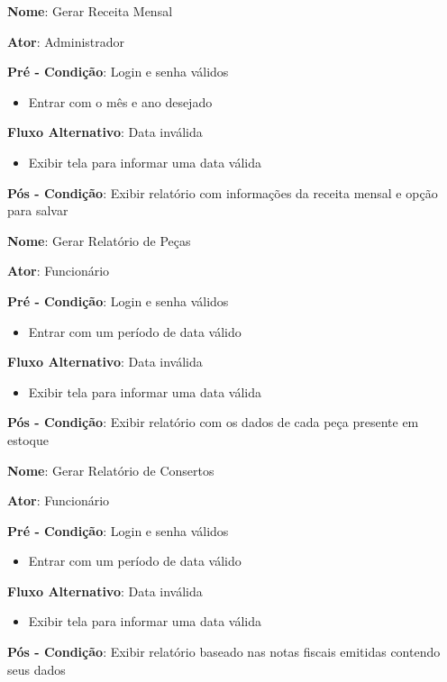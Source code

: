 \documentclass[a4paper,10pt]{article}
\begin{document}
\begin{framed}
\textbf{Nome}: Gerar Receita Mensal

\textbf{Ator}: Administrador

\textbf{Pré - Condição}: Login e senha válidos
\begin{itemize}
\item Entrar com o mês e ano desejado
\end{itemize}
\textbf{Fluxo Alternativo}: Data inválida
\begin{itemize}
\item Exibir tela para informar uma data válida
\end{itemize}
\textbf{Pós - Condição}: Exibir relatório com informações da receita mensal e opção para salvar
\end{framed}

\begin{framed}
\textbf{Nome}: Gerar Relatório de Peças

\textbf{Ator}: Funcionário

\textbf{Pré - Condição}: Login e senha válidos
\begin{itemize}
\item Entrar com um período de data válido
\end{itemize}
\textbf{Fluxo Alternativo}: Data inválida
\begin{itemize}
\item Exibir tela para informar uma data válida
\end{itemize}
\textbf{Pós - Condição}: Exibir relatório com os dados de cada peça presente em estoque
\end{framed}

\begin{framed}
\textbf{Nome}: Gerar Relatório de Consertos

\textbf{Ator}: Funcionário

\textbf{Pré - Condição}: Login e senha válidos
\begin{itemize}
\item Entrar com um período de data válido
\end{itemize}
\textbf{Fluxo Alternativo}: Data inválida
\begin{itemize}
\item Exibir tela para informar uma data válida
\end{itemize}
\textbf{Pós - Condição}: Exibir relatório baseado nas notas fiscais emitidas contendo seus dados
\end{framed}
\end{document}
